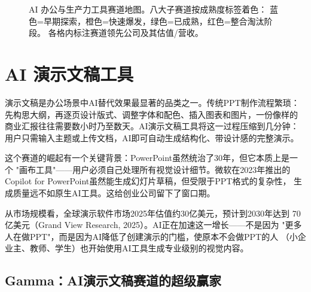 \begin{figure}[htbp]
\caption{AI 办公与生产力工具赛道地图。八大子赛道按成熟度标签着色：
蓝色=早期探索，橙色=快速爆发，绿色=已成熟，红色=整合淘汰阶段。
各格内标注赛道领先公司及其估值/营收。}
\label{fig:cprod-landscape}
\end{figure}



\section{AI 演示文稿工具}
\label{sec:cprod-ppt}

演示文稿是办公场景中AI替代效果最显著的品类之一。传统PPT制作流程繁琐：
先构思大纲，再逐页设计版式、调整字体和配色、插入图表和图片，一份像样的
商业汇报往往需要数小时乃至数天。AI演示文稿工具将这一过程压缩到几分钟：
用户只需输入主题或上传文档，AI即可自动生成结构化、带设计感的完整演示。

这个赛道的崛起有一个关键背景：PowerPoint虽然统治了30年，但它本质上是一个
"画布工具"——用户必须自己处理所有视觉设计细节。微软在2023年推出的
Copilot for PowerPoint虽然能生成幻灯片草稿，但受限于PPT格式的复杂性，
生成质量远不如原生AI工具。这给创业公司留下了窗口期。

从市场规模看，全球演示软件市场2025年估值约30亿美元，预计到2030年达到
70亿美元（Grand View Research, 2025）。AI正在加速这一增长——不是因为
"更多人在做PPT"，而是因为AI降低了创建演示的门槛，使原本不会做PPT的人
（小企业主、教师、学生）也开始使用AI工具生成专业级别的视觉内容。

\subsection{Gamma：AI演示文稿赛道的超级赢家}
\label{subsec:gamma}

